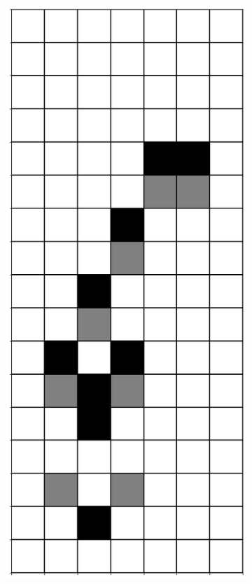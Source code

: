 \documentclass[12pt]{article}
\numberwithin{figure}{section} %
\begin{document}
\begin{figure}[H]
\begin{subfigure}{0.3\textwidth}
     \includegraphics[angle=270,width=\linewidth]{Section4/14.0}

\end{subfigure}
\end{figure}
\end{document}
